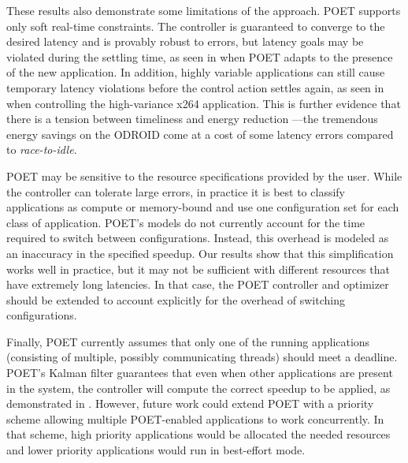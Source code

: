 These results also demonstrate some limitations of the approach.
POET supports only soft real-time constraints.
The controller is guaranteed to converge to the desired latency and is provably robust to errors, but latency goals may be violated during the settling time, as seen in  when POET adapts to the presence of the new application.
In addition, highly variable applications can still cause temporary latency violations before the control action settles again, as seen in  when controlling the high-variance x264 application.
This is further evidence that there is a tension between timeliness and energy reduction \cite{Abeni}---the tremendous energy savings on the ODROID come at a cost of some latency errors compared to \emph{race-to-idle}.


POET may be sensitive to the resource specifications provided by the user.
While the controller can tolerate large errors, in practice it is best to classify applications as compute or memory-bound and use one configuration set for each class of application.
POET's models do not currently account for the time required to switch between configurations.
Instead, this overhead is modeled as an inaccuracy in the specified speedup.
Our results show that this simplification works well in practice, but it may not be sufficient with different resources that have extremely long latencies.
In that case, the POET controller and optimizer should be extended to account explicitly for the overhead of switching configurations.
 
Finally, POET currently assumes that only one of the running applications (consisting of multiple, possibly communicating threads) should meet a deadline.
POET's Kalman filter guarantees that even when other applications are present in the system, the controller will compute the correct speedup to be applied, as demonstrated in .
However, future work could extend POET with a priority scheme allowing multiple POET-enabled applications to work concurrently.
In that scheme, high priority applications would be allocated the needed resources and lower priority applications would run in best-effort mode.
